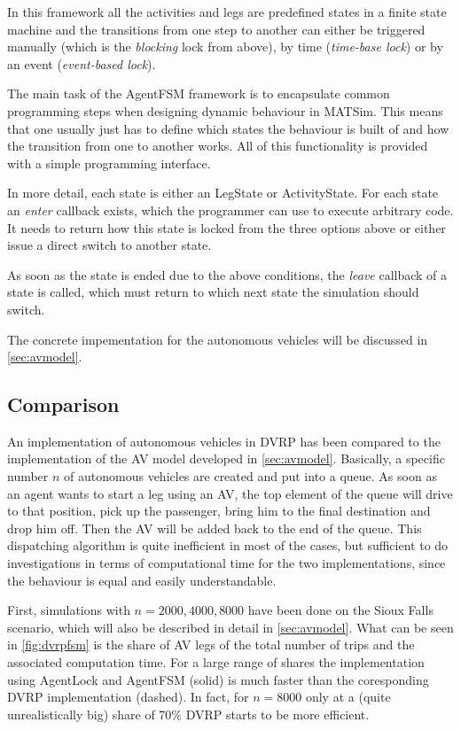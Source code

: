 In this framework all the activities and legs are predefined states in a finite
state machine and the transitions from one step to another can either be triggered
manually (which is the \textit{blocking} lock from above), by time (\textit{time-base lock})
or by an event (\textit{event-based lock}).

The main task of the AgentFSM framework is to encapsulate common programming steps
when designing dynamic behaviour in MATSim. This means that one usually just has
to define which states the behaviour is built of and how the transition from one
to another works. All of this functionality is provided with a simple programming
interface.

In more detail, each state is either an LegState or ActivityState. For each state
an \textit{enter} callback exists, which the programmer can use to execute arbitrary
code. It needs to return how this state is locked from the three options above or
either issue a direct switch to another state.

As soon as the state is ended due to the above conditions, the \textit{leave} callback
of a state is called, which must return to which next state the simulation should
switch.

The concrete impementation for the autonomous vehicles will be discussed in \cref{sec:avmodel}.

\subsection{Comparison}

An implementation of autonomous vehicles in DVRP has been compared to the implementation
of the AV model developed in \cref{sec:avmodel}. Basically, a specific number $n$ of
autonomous vehicles are created and put into a queue. As soon as an agent wants to
start a leg using an AV, the top element of the queue will drive to that position,
pick up the passenger, bring him to the final destination and drop him off. Then
the AV will be added back to the end of the queue. This dispatching algorithm is
quite inefficient in most of the cases, but sufficient to do investigations in terms
of computational time for the two implementations, since the behaviour is equal and
easily understandable.

First, simulations with $n=2000, 4000, 8000$ have been done on the Sioux Falls scenario, which
will also be described in detail in \cref{sec:avmodel}. What can be seen in \cref{fig:dvrpfsm}
is the share of AV legs of the total number of trips and the associated computation
time. For a large range of shares the implementation using AgentLock and AgentFSM (solid)
is much faster than the coresponding DVRP implementation (dashed). In fact, for $n=8000$
only at a (quite unrealistically big) share of 70\% DVRP starts to be more efficient.

